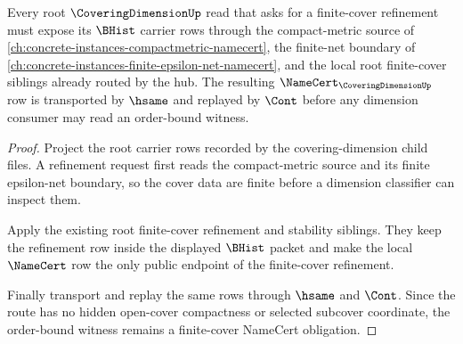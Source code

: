 \begin{theorem}
\label{thm:coveringdimension-root-finite-cover-refinement-obligation}
Every root $\CoveringDimensionUp$ read that asks for a finite-cover refinement must expose its $\BHist$ carrier rows through the compact-metric source of \autoref{ch:concrete-instances-compactmetric-namecert}, the finite-net boundary of \autoref{ch:concrete-instances-finite-epsilon-net-namecert}, and the local root finite-cover siblings already routed by the hub. The resulting $\NameCert_{\CoveringDimensionUp}$ row is transported by $\hsame$ and replayed by $\Cont$ before any dimension consumer may read an order-bound witness.
\end{theorem}
\begin{proof}
Project the root carrier rows recorded by the covering-dimension child files. A refinement request first reads the compact-metric source and its finite epsilon-net boundary, so the cover data are finite before a dimension classifier can inspect them.

Apply the existing root finite-cover refinement and stability siblings. They keep the refinement row inside the displayed $\BHist$ packet and make the local $\NameCert$ row the only public endpoint of the finite-cover refinement.

Finally transport and replay the same rows through $\hsame$ and $\Cont$. Since the route has no hidden open-cover compactness or selected subcover coordinate, the order-bound witness remains a finite-cover NameCert obligation.
\end{proof}

